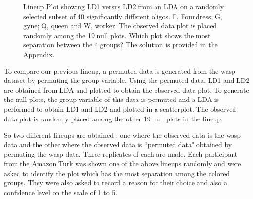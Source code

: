 \documentclass[12]{article}
\begin{document}
\begin{figure}[hbtp]
   \centering
       \caption{Lineup Plot showing LD1 versus LD2 from an LDA on a randomly selected subset of 40 significantly different oligos. F, Foundress; G, gyne; Q, queen and W, worker. The observed data plot is placed randomly among the 19 null plots. Which plot shows the most separation between the 4 groups? The solution is provided in the Appendix.}
       \label{toth_lineup}
\end{figure} 

To compare our previous lineup, a permuted data is generated from the wasp dataset by permuting the group variable. Using the permuted data, LD1 and LD2 are obtained from LDA and plotted to obtain the observed data plot. To generate the null plots, the group variable of this data is permuted and a LDA is performed to obtain LD1 and LD2 and plotted in a scatterplot. The observed data plot is randomly placed among the other 19 null plots in the lineup. 

So two different lineups are obtained : one where the observed data is the wasp data and the other where the observed data is ``permuted data" obtained by permuting the wasp data. Three replicates of each are made. Each participant from the Amazon Turk was shown one of the above lineups randomly and were asked to identify the plot which has the most separation among the colored groups. They were also asked to record a reason for their choice and also a confidence level on the scale of 1 to 5.
\end{document}
